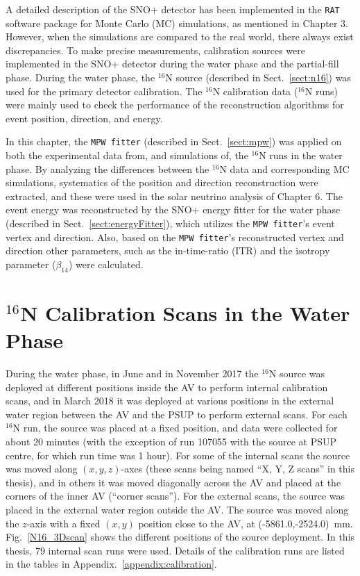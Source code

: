 A detailed description of the SNO+ detector has been implemented in the \texttt{RAT} software package for Monte Carlo (MC) simulations, as mentioned in Chapter 3. However, when the simulations are compared to the real world, there always exist discrepancies. To make precise measurements, calibration sources were implemented in the SNO+ detector during the water phase and the partial-fill phase. During the water phase, the $^{16}$N source (described in Sect.~\ref{sect:n16}) was used for the primary detector calibration. The $^{16}$N calibration data ($^{16}$N runs) were mainly used to check the performance of the reconstruction algorithms for event position, direction, and energy. 

In this chapter, the \texttt{MPW fitter} (described in Sect.~\ref{sect:mpw}) was applied on both the experimental data from, and simulations of, the $^{16}$N runs in the water phase. By analyzing the differences between the $^{16}$N data and corresponding MC simulations, systematics of the position and direction reconstruction were extracted, and these were used in the solar neutrino analysis of Chapter 6. The event energy was reconstructed by the SNO+ energy fitter for the water phase (described in Sect.~\ref{sect:energyFitter}), which utilizes the \texttt{MPW fitter}'s event vertex and direction. Also, based on the \texttt{MPW fitter}'s reconstructed vertex and direction other parameters, such as the in-time-ratio (ITR) and the isotropy parameter ($\beta_{14}$) were calculated.

\section{$^{16}${N} Calibration Scans in the Water Phase}\label{sect:n16_water}

During the water phase, in June and in November 2017 the $^{16}$N source was deployed at different positions inside the AV to perform internal calibration scans, and in March 2018 it was deployed at various positions in the external water region between the AV and the PSUP to perform external scans. For each $^{16}$N run, the source was placed at a fixed position, and data were collected for about 20 minutes (with the exception of run 107055 with the source at PSUP centre, for which run time was 1 hour). For some of the internal scans the source was moved along $(x,y,z)$-axes (these scans being named ``X, Y, Z scans'' in this thesis), and in others it was moved diagonally across the AV and placed at the corners of the inner AV (``corner scans''). For the external scans, the source was placed in the external water region outside the AV. The source was moved along the $z$-axis with a fixed $(x,y)$ position close to the AV, at (-5861.0,-2524.0)~mm. Fig.~\ref{N16_3Dscan} shows the different positions of the source deployment. In this thesis, 79 internal scan runs were used. Details of the calibration runs are listed in the tables in Appendix.~\ref{appendix:calibration}. %

